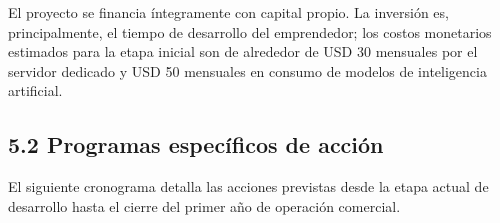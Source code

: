 El proyecto se financia íntegramente con capital propio. La inversión
es, principalmente, el tiempo de desarrollo del emprendedor; los costos
monetarios estimados para la etapa inicial son de alrededor de USD 30
mensuales por el servidor dedicado y USD 50 mensuales en consumo de
modelos de inteligencia artificial.

\subsection*{5.2 Programas específicos de
acción}\label{programas-especuxedficos-de-acciuxf3n}

El siguiente cronograma detalla las acciones previstas desde la etapa
actual de desarrollo hasta el cierre del primer año de operación
comercial.

